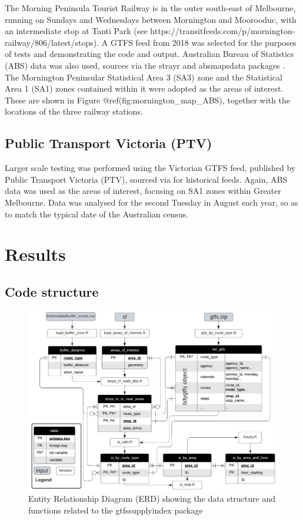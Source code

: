 \documentclass[preprint, 3p,
authoryear]{elsarticle} %
\begin{document}
The Morning Peninsula Tourist Railway is in the outer south-east of
Melbourne, running on Sundays and Wednesdays between Mornington and
Moorooduc, with an intermediate stop at Tanti Park (see
https://transitfeeds.com/p/mornington-railway/806/latest/stops). A GTFS
feed from 2018 was selected for the purposes of tests and demonstrating
the code and output. Australian Bureau of Statistics (ABS) data was also
used, sources via the strayr and absmapsdata packages \citep{r-strayr}.
The Mornington Peninsular Statistical Area 3 (SA3) zone and the
Statistical Area 1 (SA1) zones contained within it were adopted as the
areas of interest. These are shown in Figure
@ref(fig:mornington\_map\_ABS), together with the locations of the three
railway stations.

\hypertarget{public-transport-victoria-ptv}{%
\subsection{Public Transport Victoria
(PTV)}\label{public-transport-victoria-ptv}}

Larger scale testing was performed using the Victorian GTFS feed,
published by Public Transport Victoria (PTV), sourced via
\citet{transitfeeds_victoria:2023aa} for historical feeds. Again, ABS
data was used as the areas of interest, focusing on SA1 zones within
Greater Melbourne. Data was analysed for the second Tuesday in August
each year, so as to match the typical date of the Australian census.

\hypertarget{results}{%
\section{Results}\label{results}}

\hypertarget{code-structure}{%
\subsection{Code structure}\label{code-structure}}

\begin{figure}
\includegraphics[width=1\linewidth]{graphics/SI_data_structure} \caption{Entity Relationship Diagram (ERD) showing the data structure and functions related to the gtfssupplyindex package}\label{fig:SI_ERD}
\end{figure}
\end{document}
